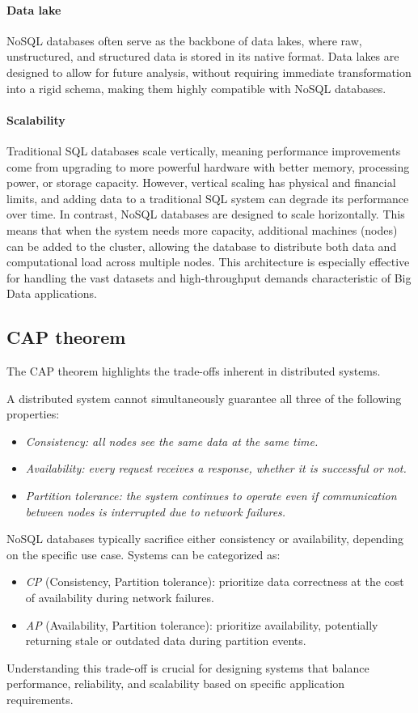 \paragraph*{Data lake}
NoSQL databases often serve as the backbone of data lakes, where raw, unstructured, and structured data is stored in its native format. 
Data lakes are designed to allow for future analysis, without requiring immediate transformation into a rigid schema, making them highly compatible with NoSQL databases.

\paragraph*{Scalability}
Traditional SQL databases scale vertically, meaning performance improvements come from upgrading to more powerful hardware with better memory, processing power, or storage capacity. 
However, vertical scaling has physical and financial limits, and adding data to a traditional SQL system can degrade its performance over time.
In contrast, NoSQL databases are designed to scale horizontally. 
This means that when the system needs more capacity, additional machines (nodes) can be added to the cluster, allowing the database to distribute both data and computational load across multiple nodes. 
This architecture is especially effective for handling the vast datasets and high-throughput demands characteristic of Big Data applications.

\subsection{CAP theorem}
The CAP theorem highlights the trade-offs inherent in distributed systems.
\begin{theorem}
A distributed system cannot simultaneously guarantee all three of the following properties:
\end{theorem}
\begin{itemize}
    \item \textit{Consistency: all nodes see the same data at the same time.}
    \item \textit{Availability: every request receives a response, whether it is successful or not.}
    \item \textit{Partition tolerance: the system continues to operate even if communication between nodes is interrupted due to network failures.}
\end{itemize}
NoSQL databases typically sacrifice either consistency or availability, depending on the specific use case. 
Systems can be categorized as:
\begin{itemize}
    \item \textit{CP} (Consistency, Partition tolerance): prioritize data correctness at the cost of availability during network failures.
    \item \textit{AP} (Availability, Partition tolerance): prioritize availability, potentially returning stale or outdated data during partition events.
\end{itemize}
Understanding this trade-off is crucial for designing systems that balance performance, reliability, and scalability based on specific application requirements.

